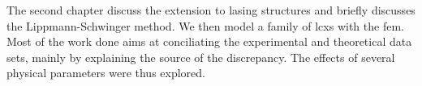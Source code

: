 The second chapter discuss the extension to lasing structures and briefly
discusses the Lippmann-Schwinger method. We then model a family of \glspl{lcx}
with the \gls{fem}. Most of the work done aims at conciliating the 
experimental and theoretical data sets, mainly by explaining the source
of the discrepancy. The effects of several physical parameters were thus explored. 

% 
% 
% 
